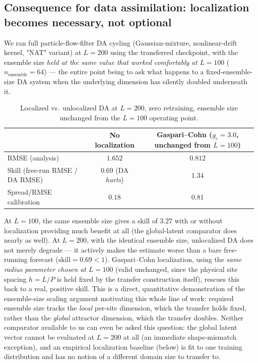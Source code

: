 \documentclass[11pt]{article}
\begin{document}
\subsection{Consequence for data assimilation: localization becomes necessary, not optional}
\label{sec:da_transfer}

We ran full particle-flow-filter DA cycling (Gaussian-mixture,
nonlinear-drift kernel, "NAT" variant) at $L=200$ using the transferred
checkpoint, with the ensemble size \emph{held at the same value that
worked comfortably at $L=100$} ($n_{\mathrm{ensemble}}=64$) --- the
entire point being to ask what happens to a fixed-ensemble-size DA
system when the underlying dimension has silently doubled underneath
it.

\begin{table}[h]
\centering
\begin{tabular}{lcc}
\toprule
 & No localization & Gaspari--Cohn ($g_c=3.0$, unchanged from $L=100$) \\
\midrule
RMSE (analysis) & $1.652$ & $\mathbf{0.812}$ \\
Skill (free-run RMSE / DA RMSE) & $0.69$ (DA \emph{hurts}) & $\mathbf{1.34}$ \\
Spread/RMSE calibration & $0.18$ & $0.81$ \\
\bottomrule
\end{tabular}
\caption{Localized vs.\ unlocalized DA at $L=200$, zero retraining,
ensemble size unchanged from the $L=100$ operating point.}
\label{tab:da_transfer}
\end{table}

At $L=100$, the same ensemble size gives a skill of $3.27$ with or
without localization providing much benefit at all (the global-latent
comparator does nearly as well). At $L=200$, with the identical
ensemble size, unlocalized DA does not merely degrade --- it actively
makes the estimate worse than a bare free-running forecast
($\mathrm{skill} = 0.69 < 1$). Gaspari--Cohn localization, using the
\emph{same radius parameter chosen at $L=100$} (valid unchanged, since
the physical site spacing $h = L/P$ is held fixed by the transfer
construction itself), rescues this back to a real, positive skill.
This is a direct, quantitative demonstration of the ensemble-size
scaling argument motivating this whole line of work: required ensemble
size tracks the \emph{local} per-site dimension, which the transfer
holds fixed, rather than the \emph{global} attractor dimension, which
the transfer doubles. Neither comparator available to us can even be
asked this question: the global latent vector cannot be evaluated at
$L=200$ at all (an immediate shape-mismatch exception), and an
empirical localization baseline (below) is fit to one training
distribution and has no notion of a different domain size to transfer
to.
\end{document}
